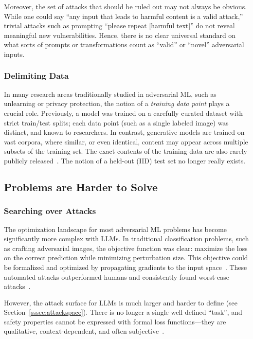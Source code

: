 Moreover, the set of attacks that should be ruled out may not always be obvious. While one could say ``any input that leads to harmful content is a valid attack,'' trivial attacks such as prompting ``please repeat [harmful text]'' do not reveal meaningful new vulnerabilities. Hence, there is no clear universal standard on what sorts of prompts or transformations count as ``valid'' or ``novel'' adversarial inputs.

\subsubsection{Delimiting Data}
\label{sssec:databound}

In many research areas traditionally studied in adversarial ML, such as unlearning or privacy protection, the notion of a \emph{training data point} plays a crucial role.
Previously, a model was trained on a carefully curated dataset with strict train/test splits; each data point (such as a single labeled image) was distinct, and known to researchers.
In contrast, generative models are trained on vast corpora, where similar, or even identical, content may appear across multiple subsets of the training set. The exact contents of the training data are also rarely publicly released~\citep{nasr2025scalable}. The notion of a held-out (IID) test set no longer really exists.


\subsection{Problems are Harder to Solve}

\subsubsection{Searching over Attacks}
\label{sssec:searchattacks}

The optimization landscape for most adversarial ML problems has become significantly more complex with LLMs. In traditional classification problems, such as crafting adversarial images, the objective function was clear: maximize the loss on the correct prediction while minimizing perturbation size. This objective could be formalized and optimized by propagating gradients to the input space~\citep{madry2017towards}. These automated attacks outperformed humans and consistently found worst-case attacks~\citep{carlini2017provably}.

However, the attack surface for LLMs is much larger and harder to define (see Section~\ref{sssec:attackspace}). There is no longer a single well-defined ``task'', and safety properties cannot be expressed with formal loss functions---they are qualitative, context-dependent, and often subjective~\citep{bai2022training}. 


